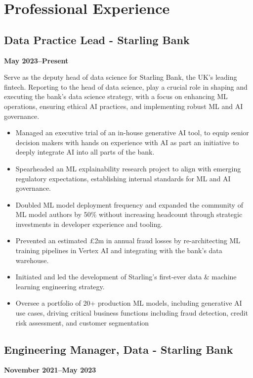 \documentclass[a4paper]{scrartcl}
\begin{document}
\section*{Professional Experience}

\subsection*{Data Practice Lead - Starling Bank}
\textbf{May 2023--Present}

Serve as the deputy head of data science for Starling Bank, the UK's leading fintech. Reporting to the head of data science, play a crucial role in shaping and executing the bank's data science strategy, with a focus on enhancing ML operations, ensuring ethical AI practices, and implementing robust ML and AI governance.
\begin{itemize}
	\item Managed an executive trial of an in-house generative AI tool, to equip senior decision makers with hands on experience with AI as part an initiative to deeply integrate AI into all parts of the bank.
	\item Spearheaded an ML explainability research project to align with emerging regulatory expectations, establishing internal standards for ML and AI governance.
	\item Doubled ML model deployment frequency and expanded the community of ML model authors by 50\% without increasing headcount through strategic investments in developer experience and tooling.
	\item Prevented an estimated £2m in annual fraud losses by re-architecting ML training pipelines in Vertex AI and integrating with the bank's data warehouse.
	\item Initiated and led the development of Starling's first-ever data \& machine learning engineering strategy.
	\item Oversee a portfolio of 20+ production ML models, including generative AI use cases, driving critical business functions including fraud detection, credit risk assessment, and customer segmentation
\end{itemize}

\subsection*{Engineering Manager, Data - Starling Bank}
\textbf{November 2021--May 2023}
\end{document}
